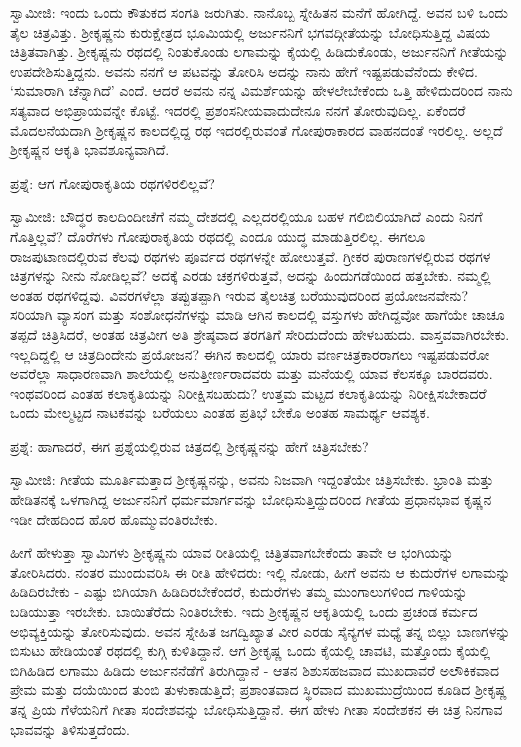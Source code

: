 ಸ್ವಾಮೀಜಿ: ಇಂದು ಒಂದು ಕೌತುಕದ ಸಂಗತಿ ಜರುಗಿತು. ನಾನೊಬ್ಬ ಸ್ನೇಹಿತನ ಮನೆಗೆ ಹೋಗಿದ್ದೆ. ಅವನ ಬಳಿ ಒಂದು ತೈಲ ಚಿತ್ರವಿತ್ತು. ಶ‍್ರೀಕೃಷ್ಣನು ಕುರುಕ್ಷೇತ್ರದ ಭೂಮಿಯಲ್ಲಿ ಅರ್ಜುನನಿಗೆ ಭಗವದ್ಗೀತೆಯನ್ನು ಬೋಧಿಸುತ್ತಿದ್ದ ವಿಷಯ ಚಿತ್ರಿತವಾಗಿತ್ತು. ಶ‍್ರೀಕೃಷ್ಣನು ರಥದಲ್ಲಿ ನಿಂತುಕೊಂಡು ಲಗಾಮನ್ನು ಕೈಯಲ್ಲಿ ಹಿಡಿದುಕೊಂಡು, ಅರ್ಜುನನಿಗೆ ಗೀತೆಯನ್ನು ಉಪದೇಶಿಸುತ್ತಿದ್ದನು. ಅವನು ನನಗೆ ಆ ಪಟವನ್ನು ತೋರಿಸಿ ಅದನ್ನು ನಾನು ಹೇಗೆ ಇಷ್ಟಪಡುವೆನೆಂದು ಕೇಳಿದ. ‘ಸುಮಾರಾಗಿ ಚೆನ್ನಾಗಿದೆ’ ಎಂದೆ. ಆದರೆ ಅವನು ನನ್ನ ವಿಮರ್ಶೆಯನ್ನು ಹೇಳಲೇಬೇಕೆಂದು ಒತ್ತಿ ಹೇಳಿದುದರಿಂದ ನಾನು ಸತ್ಯವಾದ ಅಭಿಪ್ರಾಯವನ್ನೇ ಕೊಟ್ಟೆ. ಇದರಲ್ಲಿ ಪ್ರಶಂಸನೀಯವಾದುದೇನೂ ನನಗೆ ತೋರುವುದಿಲ್ಲ. ಏಕೆಂದರೆ ಮೊದಲನೆಯದಾಗಿ ಶ‍್ರೀಕೃಷ್ಣನ ಕಾಲದಲ್ಲಿದ್ದ ರಥ ಇದರಲ್ಲಿರುವಂತೆ ಗೋಪುರಾಕಾರದ ವಾಹನದಂತೆ ಇರಲಿಲ್ಲ. ಅಲ್ಲದೆ ಶ‍್ರೀಕೃಷ್ಣನ ಆಕೃತಿ ಭಾವಶೂನ್ಯವಾಗಿದೆ.

ಪ್ರಶ್ನೆ: ಆಗ ಗೋಪುರಾಕೃತಿಯ ರಥಗಳಿರಲಿಲ್ಲವೆ?

ಸ್ವಾಮೀಜಿ: ಬೌದ್ಧರ ಕಾಲದಿಂದೀಚೆಗೆ ನಮ್ಮ ದೇಶದಲ್ಲಿ ಎಲ್ಲದರಲ್ಲಿಯೂ ಬಹಳ ಗಲಿಬಿಲಿಯಾಗಿದೆ ಎಂದು ನಿನಗೆ ಗೊತ್ತಿಲ್ಲವೆ? ದೊರೆಗಳು ಗೋಪುರಾಕೃತಿಯ ರಥದಲ್ಲಿ ಎಂದೂ ಯುದ್ಧ ಮಾಡುತ್ತಿರಲಿಲ್ಲ. ಈಗಲೂ ರಾಜಪುಟಾಣದಲ್ಲಿರುವ ಕೆಲವು ರಥಗಳು ಪೂರ್ವದ ರಥಗಳನ್ನೇ ಹೋಲುತ್ತವೆ. ಗ್ರೀಕರ ಪುರಾಣಗಳಲ್ಲಿರುವ ರಥಗಳ ಚಿತ್ರಗಳನ್ನು ನೀನು ನೋಡಿಲ್ಲವೆ? ಅದಕ್ಕೆ ಎರಡು ಚಕ್ರಗಳಿರುತ್ತವೆ, ಅದನ್ನು ಹಿಂದುಗಡೆಯಿಂದ ಹತ್ತಬೇಕು. ನಮ್ಮಲ್ಲಿ ಅಂತಹ ರಥಗಳಿದ್ದವು. ವಿವರಗಳೆಲ್ಲಾ ತಪ್ಪುತಪ್ಪಾಗಿ ಇರುವ ತೈಲಚಿತ್ರ ಬರೆಯುವುದರಿಂದ ಪ್ರಯೋಜನವೇನು? ಸರಿಯಾಗಿ ವ್ಯಾಸಂಗ ಮತ್ತು ಸಂಶೋಧನೆಗಳನ್ನು ಮಾಡಿ ಆಗಿನ ಕಾಲದಲ್ಲಿ ವಸ್ತುಗಳು ಹೇಗಿದ್ದವೋ ಹಾಗೆಯೇ ಚಾಚೂ ತಪ್ಪದೆ ಚಿತ್ರಿಸಿದರೆ, ಅಂತಹ ಚಿತ್ರವೀಗ ಅತಿ ಶ್ರೇಷ್ಠವಾದ ತರಗತಿಗೆ ಸೇರಿದುದೆಂದು ಹೇಳಬಹುದು. ವಾಸ್ತವವಾಗಿರಬೇಕು. ಇಲ್ಲದಿದ್ದಲ್ಲಿ ಆ ಚಿತ್ರದಿಂದೇನು ಪ್ರಯೋಜನ? ಈಗಿನ ಕಾಲದಲ್ಲಿ ಯಾರು ವರ್ಣಚಿತ್ರಕಾರರಾಗಲು ಇಷ್ಟಪಡುವರೋ ಅವರೆಲ್ಲಾ ಸಾಧಾರಣವಾಗಿ ಶಾಲೆಯಲ್ಲಿ ಅನುತ್ತೀರ್ಣರಾದವರು ಮತ್ತು ಮನೆಯಲ್ಲಿ ಯಾವ ಕೆಲಸಕ್ಕೂ ಬಾರದವರು. ಇಂಥವರಿಂದ ಎಂತಹ ಕಲಾಕೃತಿಯನ್ನು ನಿರೀಕ್ಷಿಸಬಹುದು? ಉತ್ತಮ ಮಟ್ಟದ ಕಲಾಕೃತಿಯನ್ನು ನಿರೀಕ್ಷಿಸಬೇಕಾದರೆ ಒಂದು ಮೇಲ್ಮಟ್ಟದ ನಾಟಕವನ್ನು ಬರೆಯಲು ಎಂತಹ ಪ್ರತಿಭೆ ಬೇಕೊ ಅಂತಹ ಸಾಮರ್ಥ್ಯ ಆವಶ್ಯಕ.

ಪ್ರಶ್ನೆ: ಹಾಗಾದರೆ, ಈಗ ಪ್ರಶ್ನೆಯಲ್ಲಿರುವ ಚಿತ್ರದಲ್ಲಿ ಶ‍್ರೀಕೃಷ್ಣನನ್ನು ಹೇಗೆ ಚಿತ್ರಿಸಬೇಕು?

ಸ್ವಾಮೀಜಿ: ಗೀತೆಯ ಮೂರ್ತಿಮತ್ತಾದ ಶ‍್ರೀಕೃಷ್ಣನನ್ನು, ಅವನು ನಿಜವಾಗಿ ಇದ್ದಂತೆಯೇ ಚಿತ್ರಿಸಬೇಕು. ಭ್ರಾಂತಿ ಮತ್ತು ಹೇಡಿತನಕ್ಕೆ ಒಳಗಾಗಿದ್ದ ಅರ್ಜುನನಿಗೆ ಧರ್ಮಮಾರ್ಗವನ್ನು ಬೋಧಿಸುತ್ತಿದ್ದುದರಿಂದ ಗೀತೆಯ ಪ್ರಧಾನಭಾವ ಕೃಷ್ಣನ ಇಡೀ ದೇಹದಿಂದ ಹೊರ ಹೊಮ್ಮುವಂತಿರಬೇಕು.

ಹೀಗೆ ಹೇಳುತ್ತಾ ಸ್ವಾಮಿಗಳು ಶ‍್ರೀಕೃಷ್ಣನು ಯಾವ ರೀತಿಯಲ್ಲಿ ಚಿತ್ರಿತವಾಗಬೇಕೆಂದು ತಾವೇ ಆ ಭಂಗಿಯನ್ನು ತೋರಿಸಿದರು. ನಂತರ ಮುಂದುವರಿಸಿ ಈ ರೀತಿ ಹೇಳಿದರು: ಇಲ್ಲಿ ನೋಡು, ಹೀಗೆ ಅವನು ಆ ಕುದುರೆಗಳ ಲಗಾಮನ್ನು ಹಿಡಿದಿರಬೇಕು - ಎಷ್ಟು ಬಿಗಿಯಾಗಿ ಹಿಡಿದಿರಬೇಕೆಂದರೆ, ಕುದುರೆಗಳು ತಮ್ಮ ಮುಂಗಾಲುಗಳಿಂದ ಗಾಳಿಯನ್ನು ಬಡಿಯುತ್ತಾ ಇರಬೇಕು. ಬಾಯಿತೆರೆದು ನಿಂತಿರಬೇಕು. ಇದು ಶ‍್ರೀಕೃಷ್ಣನ ಆಕೃತಿಯಲ್ಲಿ ಒಂದು ಪ್ರಚಂಡ ಕರ್ಮದ ಅಭಿವ್ಯಕ್ತಿಯನ್ನು ತೋರಿಸುವುದು. ಅವನ ಸ್ನೇಹಿತ ಜಗದ್ವಿಖ್ಯಾತ ವೀರ ಎರಡು ಸೈನ್ಯಗಳ ಮಧ್ಯೆ ತನ್ನ ಬಿಲ್ಲು ಬಾಣಗಳನ್ನು ಬಿಸುಟು ಹೇಡಿಯಂತೆ ರಥದಲ್ಲಿ ಕುಗ್ಗಿ ಕುಳಿತಿದ್ದಾನೆ. ಆಗ ಶ‍್ರೀಕೃಷ್ಣ ಒಂದು ಕೈಯಲ್ಲಿ ಚಾವಟಿ, ಮತ್ತೊಂದು ಕೈಯಲ್ಲಿ ಬಿಗಿಹಿಡಿದ ಲಗಾಮು ಹಿಡಿದು ಅರ್ಜುನನೆಡೆಗೆ ತಿರುಗಿದ್ದಾನೆ - ಆತನ ಶಿಶುಸಹಜವಾದ ಮುಖದಾವರೆ ಅಲೌಕಿಕವಾದ ಪ್ರೇಮ ಮತ್ತು ದಯೆಯಿಂದ ತುಂಬಿ ತುಳುಕಾಡುತ್ತಿದೆ; ಪ್ರಶಾಂತವಾದ ಸ್ಥಿರವಾದ ಮುಖಮುದ್ರೆಯಿಂದ ಕೂಡಿದ ಶ‍್ರೀಕೃಷ್ಣ ತನ್ನ ಪ್ರಿಯ ಗೆಳೆಯನಿಗೆ ಗೀತಾ ಸಂದೇಶವನ್ನು ಬೋಧಿಸುತ್ತಿದ್ದಾನೆ. ಈಗ ಹೇಳು ಗೀತಾ ಸಂದೇಶಕನ ಈ ಚಿತ್ರ ನಿನಗಾವ ಭಾವವನ್ನು ತಿಳಿಸುತ್ತದೆಂದು.

